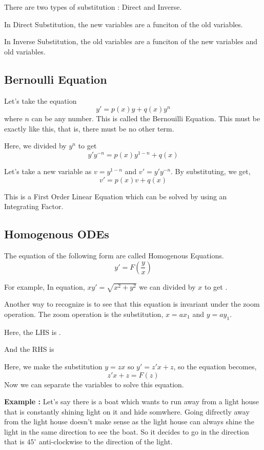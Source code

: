 There are two types of substitution : Direct and Inverse.

In Direct Substitution, the new variables are a funciton of the old variables.

In Inverse Substitution, the old variables are a funciton of the new variables and old variables.

\subsection{Bernoulli Equation}

Let's take the equation $$ y' = p(x) y + q(x) y^n $$ where $n$ can be any number.
This is called the Bernouilli Equation.
This must be exactly like this, that is, there must be no other term.

Here, we divided by $y^n$ to get $$ y' y^{-n} = p(x)y^{1-n} + q(x) $$

Let's take a new variable as $ v = y^{1-n} $ and $ v' = y' y^{-n} $.
By substituting, we get, $$ v' = p(x) v + q(x) $$

This is a First Order Linear Equation which can be solved by using an Integrating Factor.

\subsection{Homogenous ODEs}

The equation of the following form are called Homogenous Equations.
$$ y' = F \left( \frac{y}{x} \right) $$

For example, In equation, $ xy' = \sqrt{x^2 + y^2} $ we can divided by $x$ to get .

Another way to recognize is to see that this equation is invariant under the zoom operation.
The zoom operation is the substitution, $x = ax_1$ and $y = ay_1$.

Here, the LHS is .

And the RHS is 

Here, we make the substitution $y = zx$ so $y' = z'x + z$, so the equation becomes,
$$ z'x + z = F(z) $$
Now we can separate the variables to solve this equation.

{\bf Example : } Let's say there is a boat which wants to run away from a light house that is constantly shining light on it and hide somwhere.
Going difrectly away from the light house doesn't make sense as the light house can always shine the light in the same direction to see the boat.
So it decides to go in the direction that is $45^{\circ}$ anti-clockwise to the direction of the light.

